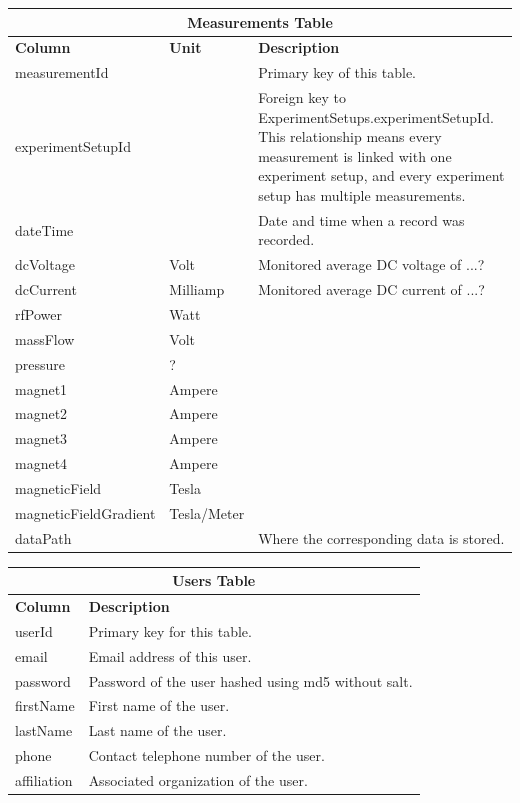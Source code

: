 \documentclass{sig-alternate}
\begin{document}
\begin{table}[h!]
\centering
\begin{tabular}{l l p{3cm}}
\multicolumn{3}{c}{\bf Measurements Table} \\ \hline
{\bf Column} & {\bf Unit} & {\bf Description}\\ \hline
measurementId & & Primary key of this table.\\ \hline
experimentSetupId & & Foreign key to ExperimentSetups.experimentSetupId. This relationship means every measurement is linked with one experiment setup, and every experiment setup has multiple measurements.\\ \hline
dateTime & & Date and time when a record was recorded.\\ \hline
dcVoltage & Volt & Monitored average DC voltage of ...?\\ \hline
dcCurrent & Milliamp & Monitored average DC current of ...?\\ \hline
rfPower & Watt & \\ \hline
massFlow & Volt & \\ \hline
pressure & ? & \\ \hline
magnet1 & Ampere & \\ \hline
magnet2 & Ampere & \\ \hline
magnet3 & Ampere & \\ \hline
magnet4 & Ampere & \\ \hline
magneticField & Tesla & \\ \hline
magneticFieldGradient & Tesla/Meter & \\ \hline
dataPath & & Where the corresponding data is stored.\\ \hline
\end{tabular}
\end{table}

\begin{table}[h!]
\centering
\begin{tabular}{l p{6cm}}
\multicolumn{2}{c}{\bf Users Table} \\ \hline
{\bf Column} & {\bf Description}\\ \hline
userId & Primary key for this table.\\ \hline
email & Email address of this user.\\ \hline
password & Password of the user hashed using md5 without salt.\\ \hline
firstName & First name of the user.\\ \hline
lastName & Last name of the user.\\ \hline
phone & Contact telephone number of the user.\\ \hline
affiliation & Associated organization of the user.\\ \hline
\end{tabular}
\end{table}
\end{document}
